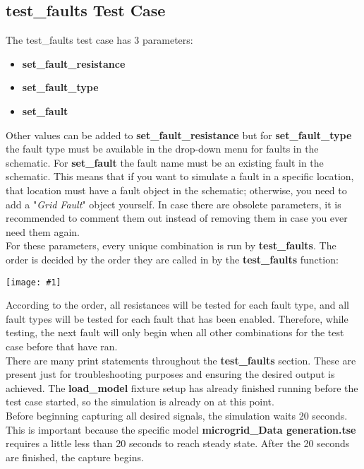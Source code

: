 \documentclass{article}
\newcommand{\centerimage}[2]{%
    \begin{center}
        \centerline{\texttt{[image: \#1]}}
    \end{center}%
}
\begin{document}
\subsection{test\_faults Test Case}
The test\_faults test case has 3 parameters: 
\begin{itemize}
    \item \textbf{set\_fault\_resistance}
    \item \textbf{set\_fault\_type}
    \item \textbf{set\_fault}
\end{itemize}

Other values can be added to \textbf{set\_fault\_resistance} but for \textbf{set\_fault\_type} the fault type must be available in the drop-down menu for faults in the schematic. For \textbf{set\_fault} the fault name must be an existing fault in the schematic. This means that if you want to simulate a fault in a specific location, that location must have a fault object in the schematic; otherwise, you need to add a "\textit{Grid Fault}" object yourself. In case there are obsolete parameters, it is recommended to comment them out instead of removing them in case you ever need them again. \\

For these parameters, every unique combination is run by \textbf{test\_faults}. The order is decided by the order they are called in by the \textbf{test\_faults} function: 

\centerimage{functioncall.png}{0.4cm}

According to the order, all resistances will be tested for each fault type, and all fault types will be tested for each fault that has been enabled. Therefore, while testing, the next fault will only begin when all other combinations for the test case before that have ran. \\

There are many print statements throughout the \textbf{test\_faults} section. These are present just for troubleshooting purposes and ensuring the desired output is achieved. The \textbf{load\_model} fixture setup has already finished running before the test case started, so the simulation is already on at this point. \\

Before beginning capturing all desired signals, the simulation waits 20 seconds. This is important because the specific model \textbf{microgrid\_Data generation.tse} requires a little less than 20 seconds to reach steady state. After the 20 seconds are finished, the capture begins. 
\end{document}
